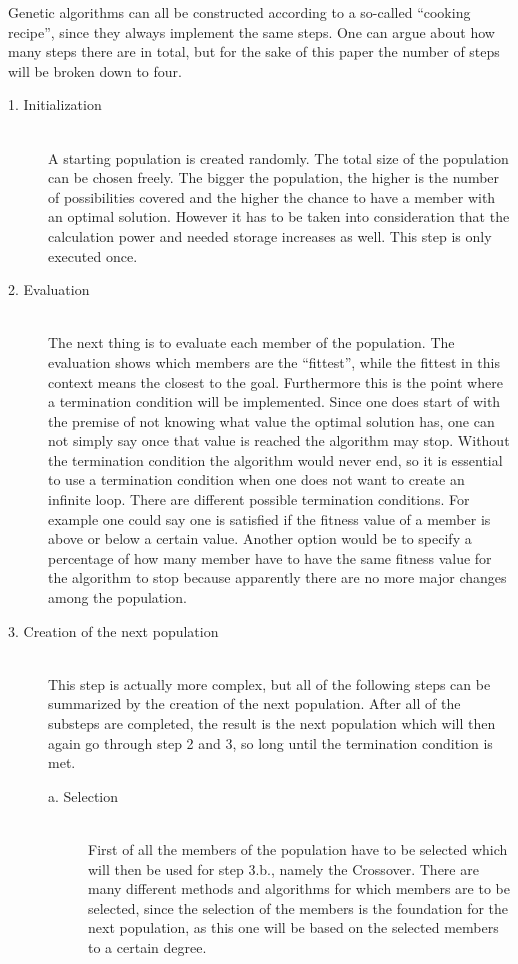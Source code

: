 \documentclass[11pt,a4paper]{article}
\begin{document}
Genetic algorithms can all be constructed according to a so-called “cooking recipe”, since they always implement the same steps. One can argue about how many steps there are in total, but for the sake of this paper the number of steps will be broken down to four.
\begin{description}
\item[1. Initialization] \hfill \\ A starting population is created randomly. The total size of the population can be chosen freely. The bigger the population, the higher is the number of possibilities covered and the higher the chance to have a member with an optimal solution. However it has to be taken into consideration that the calculation power and needed storage increases as well.
This step is only executed once.
\item[2. Evaluation] \hfill \\ The next thing is to evaluate each member of the population. The evaluation shows which members are the “fittest”, while the fittest in this context means the closest to the goal.
Furthermore this is the point where a termination condition will be implemented. Since one does start of with the premise of not knowing what value the optimal solution has, one can not simply say once that value is reached the algorithm may stop. Without the termination condition the algorithm would never end, so it is essential to use a termination condition when one does not want to create an infinite loop. There are different possible termination conditions. For example one could say one is satisfied if the fitness value of a member is above or below a certain value. Another option would be to specify a percentage of how many member have to have the same fitness value for the algorithm to stop because apparently there are no more major changes among the population.
\item[3. Creation of the next population] \hfill \\ This step is actually more complex, but all of the following steps can be summarized by the creation of the next population. After all of the substeps are completed, the result is the next population which will then again go through step 2 and 3, so long until the termination condition is met.
\begin{description}
\item[a. Selection] \hfill \\
First of all the members of the population have to be selected which will then be used for step 3.b., namely the Crossover. There are many different methods and algorithms for which members are to be selected, since the selection of the members is the foundation for the next population, as this one will be based on the selected members to a certain degree.

\end{description}
\end{description}
\end{document}
